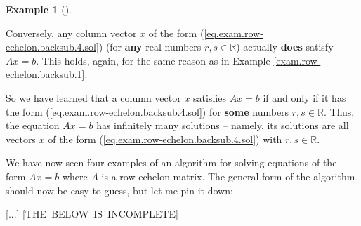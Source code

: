 \documentclass[numbers=enddot,12pt,final,onecolumn,notitlepage]{scrartcl}%
\theoremstyle{definition}
\newtheorem{exam}[theo]{Example}
\newenvironment{example}[1][]
{\begin{exam}[#1]\begin{leftbar}}
{\end{leftbar}\end{exam}}
\begin{document}
\begin{example}
Conversely, any column vector $x$ of the form
(\ref{eq.exam.row-echelon.backsub.4.sol}) (for \textbf{any} real numbers
$r,s\in\mathbb{R}$) actually \textbf{does} satisfy $Ax=b$. This holds, again,
for the same reason as in Example \ref{exam.row-echelon.backsub.1}.

So we have learned that a column vector $x$ satisfies $Ax=b$ if and only if it
has the form (\ref{eq.exam.row-echelon.backsub.4.sol}) for \textbf{some}
numbers $r,s\in\mathbb{R}$. Thus, the equation $Ax=b$ has infinitely many
solutions -- namely, its solutions are all vectors $x$ of the form
(\ref{eq.exam.row-echelon.backsub.4.sol}) with $r,s\in\mathbb{R}$.
\end{example}

We have now seen four examples of an algorithm for solving equations of the
form $Ax=b$ where $A$ is a row-echelon matrix. The general form of the
algorithm should now be easy to guess, but let me pin it down:

[...] [THE\ BELOW\ IS\ INCOMPLETE]
\end{document}

